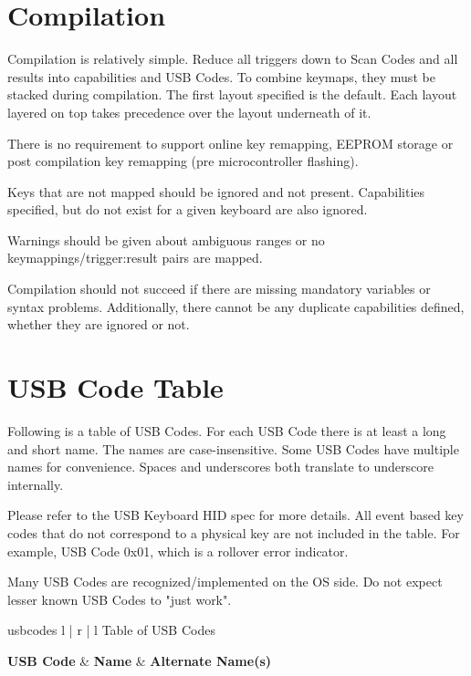 \documentclass{kiibohd-template}
\begin{document}
\chapter{Compilation}

Compilation is relatively simple.
Reduce all triggers down to Scan Codes and all results into capabilities and USB Codes.
To combine keymaps, they must be stacked during compilation.
The first layout specified is the default.
Each layout layered on top takes precedence over the layout underneath of it.

There is no requirement to support online key remapping, EEPROM storage or post compilation key remapping (pre microcontroller flashing).

Keys that are not mapped should be ignored and not present.
Capabilities specified, but do not exist for a given keyboard are also ignored.

Warnings should be given about ambiguous ranges or no keymappings/trigger:result pairs are mapped.

Compilation should not succeed if there are missing mandatory variables or syntax problems.
Additionally, there cannot be any duplicate capabilities defined, whether they are ignored or not.


\chapter{USB Code Table}
\label{chpt:USBCodeTable}

Following is a table of USB Codes.
For each USB Code there is at least a long and short name.
The names are case-insensitive.
Some USB Codes have multiple names for convenience.
Spaces and underscores both translate to underscore internally.

Please refer to the USB Keyboard HID spec for more details.
All event based key codes that do not correspond to a physical key are not included in the table.
For example, USB Code 0x01, which is a rollover error indicator.

Many USB Codes are recognized/implemented on the OS side.
Do not expect lesser known USB Codes to "just work".

\begin{ltable}{usbcodes}{ l | r | l }{Table of USB Codes}

\textbf{USB Code} & \textbf{Name} & \textbf{Alternate Name(s)} \\
\hline
\hline


\end{ltable}
\end{document}
